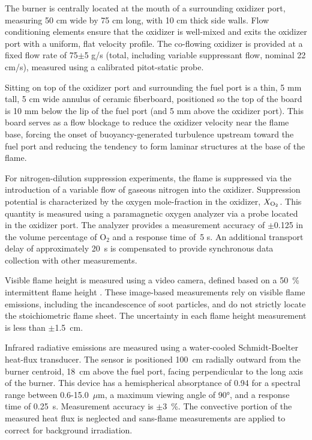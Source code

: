 The burner is centrally located at the mouth of a surrounding oxidizer port, measuring 50 cm wide by 75 cm long, with 10 cm thick side walls. Flow conditioning elements ensure that the oxidizer is well-mixed and exits the oxidizer port with a uniform, flat velocity profile. The co-flowing oxidizer is provided at a fixed flow rate of 75$\pm$5 g/s (total, including variable suppressant flow, nominal 22 cm/s), measured using a calibrated pitot-static probe.

Sitting on top of the oxidizer port and surrounding the fuel port is a thin, 5 mm tall, 5 cm wide annulus of ceramic fiberboard, positioned so the top of the board is 10 mm below the lip of the fuel port (and 5 mm above the oxidizer port). This board serves as a flow blockage to reduce the oxidizer velocity near the flame base, forcing the onset of buoyancy-generated turbulence upstream toward the fuel port and reducing the tendency to form laminar structures at the base of the flame.

For nitrogen-dilution suppression experiments, the flame is suppressed via the introduction of a variable flow of gaseous nitrogen into the oxidizer. Suppression potential is characterized by the oxygen mole-fraction in the oxidizer, $X_{\rm O_2}$. This quantity is measured using a paramagnetic oxygen analyzer via a probe located in the oxidizer port. The analyzer provides a measurement accuracy of $\pm$0.125 in the volume percentage of O$_2$ and a response time of~5 s. An additional transport delay of approximately 20~s is compensated to provide synchronous data collection with other measurements.

Visible flame height is measured using a video camera, defined based on a 50~\% intermittent flame height \cite{White:2015}. These image-based measurements rely on visible flame emissions, including the incandescence of soot particles, and do not strictly locate the stoichiometric flame sheet. The uncertainty in each flame height measurement is less than $\pm$1.5~cm.

Infrared radiative emissions are measured using a water-cooled Schmidt-Boelter heat-flux transducer. The sensor is positioned 100~cm radially outward from the burner centroid, 18~cm above the fuel port, facing perpendicular to the long axis of the burner. This device has a hemispherical absorptance of 0.94 for a spectral range between 0.6-15.0~$\mu$m, a maximum viewing angle of 90\unit{\degree}, and a response time of 0.25~s. Measurement accuracy is $\pm$3~\%. The convective portion of the measured heat flux is neglected and sans-flame measurements are applied to correct for background irradiation.

